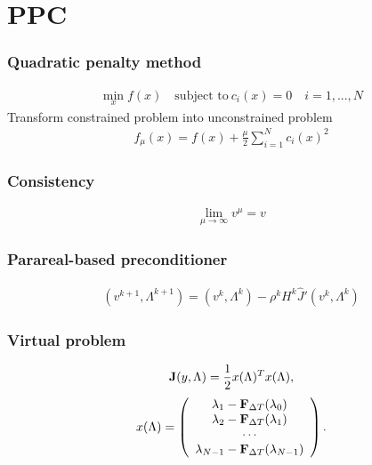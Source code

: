 \documentclass{beamer}
\begin{document}
\section{PPC}
\begin{frame}
\frametitle{Quadratic penalty method}
\begin{align*}
\min_x f(x) \quad \textrm{subject to} \ c_i(x)=0 \quad i=1,...,N
\end{align*}
Transform constrained problem into unconstrained problem
\begin{align*}
f_{\mu}(x) = f(x) + \frac{\mu }{2}\sum_{i=1}^N c_i(x)^2 
\end{align*}
\end{frame}
\begin{frame}
\frametitle{Consistency}
\begin{align*}
\lim_{\mu\rightarrow\infty} v^{\mu}=v
\end{align*}
\end{frame}
\begin{frame}
\frametitle{Parareal-based preconditioner}
\begin{align*}
(v^{k+1},\Lambda^{k+1}) = (v^k,\Lambda^k) - \rho^kH^k \hat J'(v^k,\Lambda^k)
\end{align*}
\end{frame}
\begin{frame}
\frametitle{Virtual problem}

 \begin{align}
\bold J(y,\Lambda) = \frac{1}{2} x(\Lambda)^Tx(\Lambda), \label{non_lin_LS}
\end{align}
\begin{align}
x(\Lambda)=\left( \begin{array}{c}  
   \lambda_1 - \bold F_{\Delta T}(\lambda_0) \\ 
   \lambda_2 - \bold F_{\Delta T}(\lambda_1) \\
   \cdots  \\
   \lambda_{N-1} -\bold F_{\Delta T}(\lambda_{N-1}) \\
   \end{array}  \right).
\end{align}

\end{frame}
\end{document}
